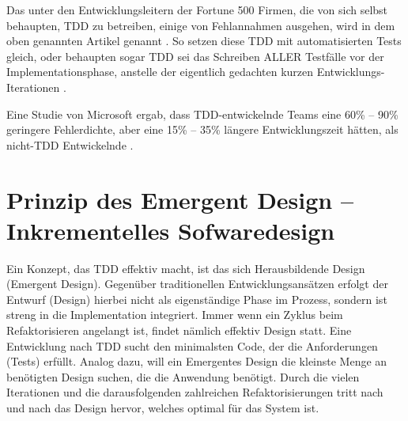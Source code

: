 Das unter den Entwicklungsleitern der Fortune 500 Firmen, die von sich selbst behaupten, TDD zu betreiben, einige von Fehlannahmen ausgehen, wird in dem oben genannten Artikel genannt \citep{janzen_does_2008}. So setzen diese TDD mit automatisierten Tests gleich, oder behaupten sogar TDD sei das Schreiben ALLER Testfälle vor der Implementationsphase, anstelle der eigentlich gedachten kurzen Entwicklungs-Iterationen \citep{janzen_does_2008}.

Eine Studie von Microsoft ergab, dass TDD-entwickelnde Teams eine 60\% -- 90\% geringere Fehlerdichte, aber eine 15\% -- 35\% längere Entwicklungszeit hätten, als nicht-TDD Entwickelnde \citep{nagappan_realizing_2008}.



\section{Prinzip des Emergent Design -- Inkrementelles Sofwaredesign}
\label{sec:tddEmergent}

Ein Konzept, das TDD effektiv macht, ist das sich Herausbildende Design (Emergent Design). Gegenüber traditionellen Entwicklungsansätzen erfolgt der Entwurf (Design) hierbei nicht als eigenständige Phase im Prozess, sondern ist streng in die Implementation integriert. Immer wenn ein Zyklus beim Refaktorisieren angelangt ist, findet nämlich effektiv Design statt. Eine Entwicklung nach TDD sucht den minimalsten Code, der die Anforderungen (Tests) erfüllt. Analog dazu, will ein Emergentes Design die kleinste Menge an benötigten Design suchen, die die Anwendung benötigt. Durch die vielen Iterationen und die darausfolgenden zahlreichen Refaktorisierungen tritt nach und nach das Design hervor, welches optimal für das System ist.







